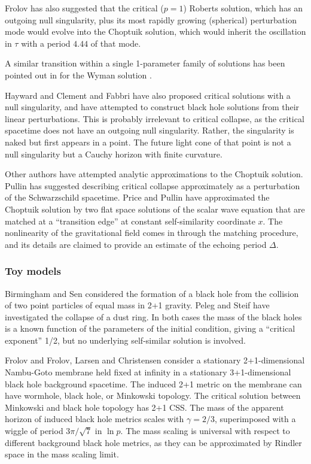 \documentclass{article}
\begin{document}
Frolov \cite{Frolov4} has also suggested that the critical ($p=1$)
Roberts solution,
which has an outgoing null singularity, plus its most rapidly growing
(spherical) perturbation mode would evolve into the Choptuik solution,
which would inherit the oscillation in $\tau$ with a period $4.44$ of
that mode.

A similar transition within a single 1-parameter family of
solutions has been pointed out in \cite{Oliveira} for the Wyman
solution \cite{Wyman}.

Hayward \cite{Hayward,Haywarderratum} and Clement and Fabbri
\cite{ClementFabbri1,ClementFabbri2} have also proposed critical
solutions with a null singularity, and have attempted to construct
black hole solutions from their linear perturbations. This is probably
irrelevant to critical collapse, as the critical spacetime does not
have an outgoing null singularity. Rather, the singularity is naked
but first appears in a point. The future light cone of that point is
not a null singularity but a Cauchy horizon with finite
curvature.

Other authors have attempted analytic approximations to the Choptuik
solution.  Pullin \cite{Pullin_Chop} has suggested describing critical
collapse approximately as a perturbation of the Schwarzschild
spacetime. Price and Pullin \cite{PricePullin} have approximated the
Choptuik solution by two flat space solutions of the scalar wave
equation that are matched at a ``transition edge'' at constant
self-similarity coordinate $x$. The nonlinearity of the gravitational
field comes in through the matching procedure, and its details are
claimed to provide an estimate of the echoing period $\Delta$.


\subsubsection{Toy models}

Birmingham and Sen \cite{BirminghamSen} considered the formation of a
black hole from the collision of two point particles of equal
mass in 2+1 gravity. Peleg and Steif \cite{PelegSteif} have
investigated the collapse of a dust ring. In both cases the mass
of the black holes is a known function of the parameters of the
initial condition, giving a ``critical exponent'' 1/2, but no
underlying self-similar solution is involved.

Frolov \cite{FrolovV} and Frolov, Larsen and Christensen
\cite{FrolovVetal} consider a stationary 2+1-dimensional Nambu-Goto
membrane held fixed at infinity in a stationary 3+1-dimensional black
hole background spacetime. The induced 2+1 metric on the membrane can
have wormhole, black hole, or Minkowski topology. The critical
solution between Minkowski and black hole topology has 2+1 CSS. The
mass of the apparent horizon of induced black hole metrics scales with
$\gamma=2/3$, superimposed with a wiggle of period $3\pi/\sqrt{7}$ in
$\ln p$. The mass scaling is universal with respect to different
background black hole metrics, as they can be approximated by Rindler
space in the mass scaling limit.
\end{document}
